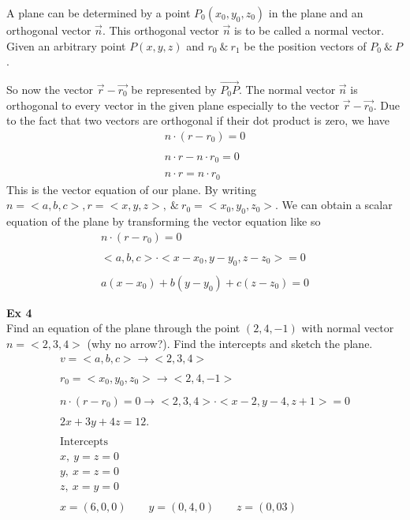 \documentclass{article}
\begin{document}
  A plane can be determined  by a point $ P_{0} (x_{0},y_{0}, z_{0})$ in the plane and an orthogonal vector $ \vec{n} $. This orthogonal vector $ \vec{n} $ is to be called a normal vector. Given an arbitrary point $ P(x,y,z) $ and $ r_{0} ~\&~ r_{1} $ be the position vectors of $ P_{0} ~\&~ P$.

  So now the vector $ \vec{r}-\vec{r_{0} }$ be represented by $ \vec{P_{0}P} $. The normal vector $ \vec{n} $ is orthogonal to every vector in the given plane especially to the vector $ \vec{r}-\vec{r_{0} } $. Due to the fact that two vectors are orthogonal if their dot product is zero, we have
  \[
    \begin{gathered}
    n \cdot (r-r_{0} )=0\\
    ~\\
    n \cdot r - n \cdot r_{0}=0\\
    ~\\
    n \cdot r = n \cdot r_{0} 
    \end{gathered}
  \]
  This is the vector equation of our plane. By writing $ n=< a, b, c >, r= < x, y, z>, ~\&~ r_{0}=< x_{0}, y_{0} , z_{0}  >    $. We can obtain a scalar equation of the plane by transforming the vector equation like so
  \[
    \begin{gathered}
    n \cdot (r-r_{0})=0\\
    ~\\
    < a, b, c > \cdot < x-x_{0} , y-y_{0} , z-z_{0} > = 0\\
    ~\\
    \boxed{a(x-x_{0}) + b(y-y_{0} )+c(z-z_{0} )=0} 
    \end{gathered}
  \]

  \textbf{Ex 4}\\
  Find an equation of the plane through the point $ (2,4,-1) $ with normal vector $ n=< 2, 3, 4 >  $ (why no arrow?). Find the intercepts and sketch the plane.
  \[
    \begin{gathered}
    v=< a, b, c>\to < 2, 3, 4 >\\
    ~\\
    r_{0} =< x_{0} , y_{0} , z_{0}  > \to < 2, 4, -1 >\\
    ~\\
    n \cdot (r-r_{0} ) = 0 \to < 2, 3, 4 > \cdot < x-2, y-4, z+1 > = 0\\
    ~\\
    2x+3y+4z=12.\\
    ~\\
    \text{Intercepts}\\
    x,~y=z=0\\
    y,~x=z=0\\
    z,~x=y=0\\
    ~\\
    x = (6,0,0) \qquad y = (0,4,0) \qquad z=(0,03)
    \end{gathered}
  \]
 
\end{document}
